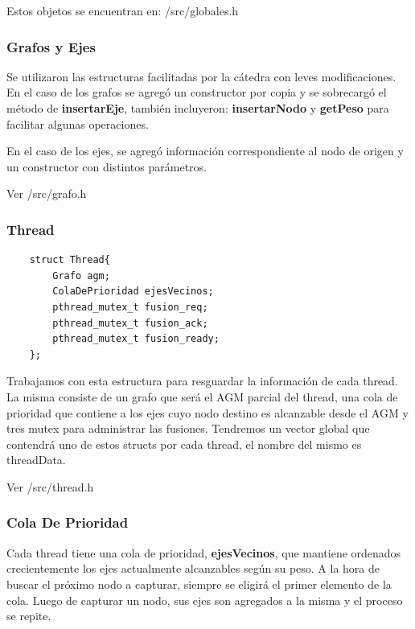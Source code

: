 Estos objetos se encuentran en: \textmd{/src/globales.h}

\subsubsection{Grafos y Ejes}

Se utilizaron las estructuras facilitadas por la cátedra con leves modificaciones. En el caso de los grafos se agregó un constructor por copia y se sobrecargó el método de \textbf{insertarEje}, también incluyeron: \textbf{insertarNodo} y \textbf{getPeso} para facilitar algunas operaciones.

En el caso de los ejes, se agregó información correspondiente al nodo de origen y un constructor con distintos parámetros.

Ver \textmd{/src/grafo.h}

\newpage

\subsubsection{Thread}

\begin{verbatim}
    struct Thread{
        Grafo agm;
        ColaDePrioridad ejesVecinos;
        pthread_mutex_t fusion_req;
        pthread_mutex_t fusion_ack;
        pthread_mutex_t fusion_ready;
    };
\end{verbatim}

Trabajamos con esta estructura para resguardar la información de cada thread. La misma consiste de un grafo que será el AGM parcial del thread, una cola de prioridad que contiene a los ejes cuyo nodo destino es alcanzable desde el AGM y tres mutex para administrar las fusiones. Tendremos un vector global que contendrá uno de estos structs por cada thread, el nombre del mismo es threadData.

Ver \textmd{/src/thread.h}

\subsubsection{Cola De Prioridad}

Cada thread tiene una cola de prioridad, \textbf{ejesVecinos}, que mantiene ordenados crecientemente los ejes actualmente alcanzables según su peso. A la hora de buscar el próximo nodo a capturar, siempre se eligirá el primer elemento de la cola. Luego de capturar un nodo, sus ejes son agregados a la misma y el proceso se repite.

